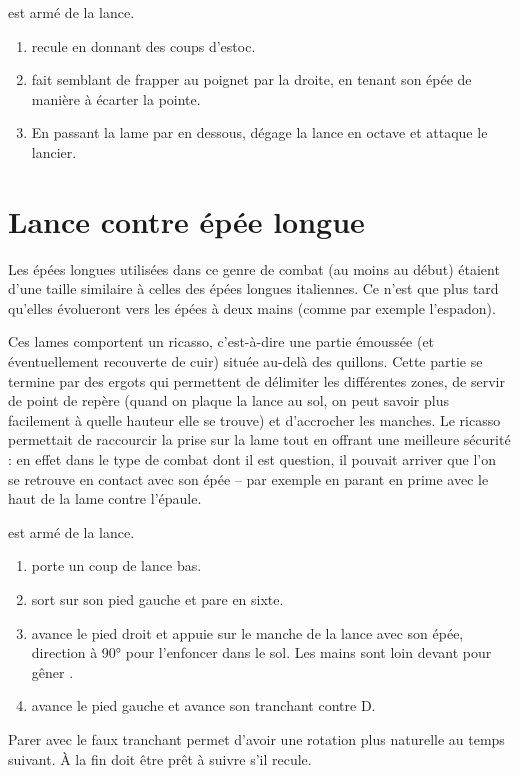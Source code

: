 \begin{technique}

\D est armé de la lance.

\begin{enumerate}
	\item \D recule en donnant des coups d'estoc.
	
	\item \A fait semblant de frapper au poignet par la droite, en tenant son épée de manière à écarter la pointe.
	
	\item En passant la lame par en dessous, \A dégage la lance en octave et attaque le lancier.
\end{enumerate}
\end{technique}


\section{Lance contre épée longue}


Les épées longues utilisées dans ce genre de combat (au moins au début) étaient d'une taille similaire à celles des épées longues italiennes.
Ce n'est que plus tard qu'elles évolueront vers les épées à deux mains (comme par exemple l'espadon).

Ces lames comportent un ricasso, c'est-à-dire une partie émoussée (et éventuellement recouverte de cuir) située au-delà des quillons.
Cette partie se termine par des ergots qui permettent de délimiter les différentes zones, de servir de point de repère (quand on plaque la lance au sol, on peut savoir plus facilement à quelle hauteur elle se trouve) et d'accrocher les manches.
Le ricasso permettait de raccourcir la prise sur la lame tout en offrant une meilleure sécurité : en effet dans le type de combat dont il est question, il pouvait arriver que l'on se retrouve en contact avec son épée – par exemple en parant en prime avec le haut de la lame contre l'épaule.


\begin{technique}

\A est armé de la lance.

\begin{enumerate}
	\item \A porte un coup de lance bas.
	
	\item \D sort sur son pied gauche et pare en sixte.
	
	\item \D avance le pied droit et appuie sur le manche de la lance avec son épée, direction à 90° pour l'enfoncer dans le sol.
	Les mains sont loin devant pour gêner \A.
	
	\item \D avance le pied gauche et avance son tranchant contre D.
\end{enumerate}

Parer avec le faux tranchant permet d'avoir une rotation plus naturelle au temps suivant. 
À la fin \D doit être prêt à suivre \A s'il recule.

\end{technique}


